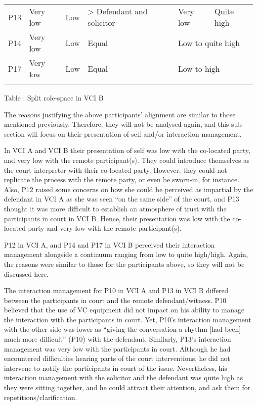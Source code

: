 \documentclass[output=paper]{langsci/langscibook}
\begin{document}
\begin{tabularx}{\textwidth}{XXXXXX}
\lsptoprule
P13 & Very low & Low & > Defendant and solicitor & \multicolumn{1}{X}{Very low} & Quite high\\
P14 & Very low & Low & Equal & \multicolumn{2}{X}{Low to quite high} \\
P17 & Very low & Low & Equal & \multicolumn{2}{X}{Low to high}\\
\lspbottomrule
\end{tabularx}
\begin{stylecaption}
Table : Split role-space in VCI B
\end{stylecaption}

The reasons justifying the above participants’ alignment are similar to those mentioned previously. Therefore, they will not be analysed again, and this sub-section will focus on their presentation of self and/or interaction management.

In VCI A and VCI B their presentation of self was low with the co-located party, and very low with the remote participant(s). They could introduce themselves as the court interpreter with their co-located party. However, they could not replicate the process with the remote party, or even be sworn-in, for instance. Also, P12 raised some concerns on how she could be perceived as impartial by the defendant in VCI A as she was seen “on the same side” of the court, and P13 thought it was more difficult to establish an atmosphere of trust with the participants in court in VCI B. Hence, their presentation was low with the co-located party and very low with the remote participant(s).

P12 in VCI A, and P14 and P17 in VCI B perceived their interaction management alongside a continuum ranging from low to quite high/high. Again, the reasons were similar to those for the participants above, so they will not be discussed here. 

The interaction management for P10 in VCI A and P13 in VCI B differed between the participants in court and the remote defendant/witness. P10 believed that the use of VC equipment did not impact on his ability to manage the interaction with the participants in court. Yet, P10’s interaction management with the other side was lower as “giving the conversation a rhythm [had been] much more difficult” (P10) with the defendant. Similarly, P13’s interaction management was very low with the participants in court. Although he had encountered difficulties hearing parts of the court interventions, he did not intervene to notify the participants in court of the issue. Nevertheless, his interaction management with the solicitor and the defendant was quite high as they were sitting together, and he could attract their attention, and ask them for repetitions/clarification.
\end{document}
